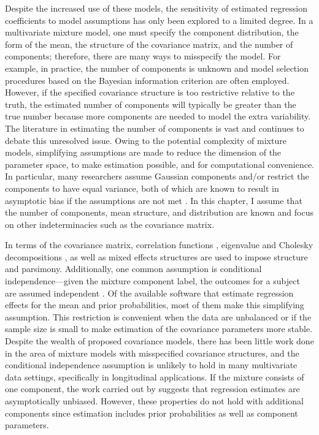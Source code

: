  Despite the increased use of these models, the sensitivity of estimated regression coefficients to model assumptions has only been explored to a limited degree. In a multivariate mixture model, one must specify the component distribution, the form of the mean, the structure of the covariance matrix, and the number of components; therefore, there are many ways to misspecify the model. For example, in practice, the number of components is unknown and model selection procedures based on the Bayesian information criterion are often employed. However, if the specified covariance structure is too restrictive relative to the truth, the estimated number of components will typically be greater than the true number because more components are needed to model the extra variability. The literature in estimating the number of components is  vast \cite{oliveira2005} and continues to debate this unresolved issue. Owing to the potential complexity of mixture models, simplifying assumptions are made to reduce the dimension of the parameter space, to make estimation possible, and for computational convenience. In particular, many researchers assume Gaussian components and/or restrict the components to have equal variance, both of which are known to result in asymptotic bias if the assumptions are not met \cite{gray1994, lo2011}. In this chapter, I assume that the number of components, mean structure, and distribution are known and focus on other indeterminacies such as the covariance matrix.
 
In terms of the covariance matrix, correlation functions \cite{diggle2002}, eigenvalue and Cholesky decompositions \cite{banfield1993,mcnicholas2010}, as well as mixed effects structures \cite{muthen1999} are used to impose structure and parsimony. Additionally, one common assumption is conditional independence---given the mixture component label, the outcomes for a subject are assumed independent \cite{ostbye2011,muthen2008}. Of the available software that estimate regression effects for the mean and prior probabilities, most of them make this simplifying assumption. This restriction is convenient when the data are unbalanced or if the sample size is small to make estimation of the covariance parameters more stable. Despite the wealth of proposed covariance models, there has been little work done in the area of mixture models with misspecified covariance structures, and the conditional independence assumption is unlikely to hold in many multivariate data settings, specifically in longitudinal applications. If the mixture consists of one component, the work carried out by \textcite{liang1986} suggests that regression estimates are asymptotically unbiased. However, these properties do not hold with additional components since estimation includes prior probabilities as well as component parameters. 

